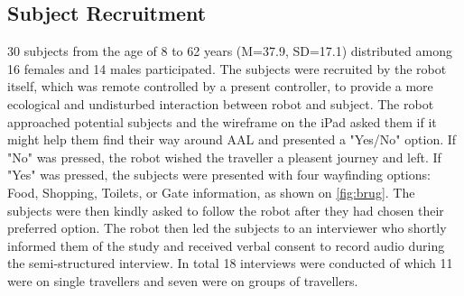 \subsection{Subject Recruitment}
30 subjects from the age of 8 to 62 years (M=37.9, SD=17.1) distributed among 16 females and 14 males participated. The subjects were recruited by the robot itself, which was remote controlled by a present controller, to provide a more ecological and undisturbed interaction between robot and subject. The robot approached potential subjects and the wireframe on the iPad asked them if it might help them find their way around AAL and presented a "Yes/No" option. If "No" was pressed, the robot wished the traveller a pleasent journey and left. If "Yes" was pressed, the subjects were presented with four wayfinding options: Food, Shopping, Toilets, or Gate information, as shown on \autoref{fig:brug}. The subjects were then kindly asked to follow the robot after they had chosen their preferred option. The robot then led the subjects to an interviewer who shortly informed them of the study and received verbal consent to record audio during the semi-structured interview. In total 18 interviews were conducted of which 11 were on single travellers and seven were on groups of travellers.
%
